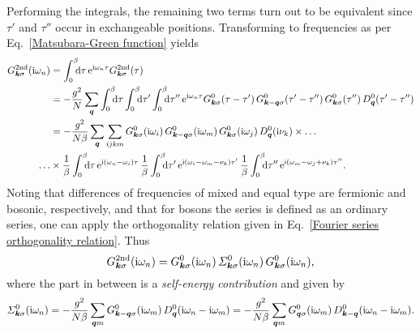 Performing the integrals, the remaining two terms turn out to be equivalent
since $\tau'$ and $\tau''$ occur in exchangeable positions. Transforming to
 frequencies as per Eq.~\ref{Matsubara-Green function} yields
%
\begin{align*}
    G \super{2nd}_{\vec k \sigma}(\I \omega_n)
    &= \int \from 0 \till \beta \D \tau \,
    \E^{\I \omega_n \tau} G \super{2nd}_{\vec k \sigma}(\tau) \\
    &= -\frac {g^2} N \sum_{\vec q}
    \int \from 0 \till \beta \D \tau
    \int \from 0 \till \beta \D \tau'
    \int \from 0 \till \beta \D \tau'' \,
    \E^{\I \omega_n \tau}
    G^0_{\vec k \sigma}(\tau - \tau') \,
    G^0_{\vec k - \vec q \sigma}(\tau' - \tau'') \,
    G^0_{\vec k \sigma}(\tau'') \,
    D^0_{\vec q}(\tau' - \tau'') \\
    &= -\frac {g^2}{N \beta} \sum_{\vec q} \sum_{i j k m}
    G^0_{\vec k \sigma}(\I \omega_i) \,
    G^0_{\vec k - \vec q \sigma}(\I \omega_m) \,
    G^0_{\vec k \sigma}(\I \omega_j) \,
    D^0_{\vec q}(\I \nu_k) \times \dots \\
    \dots &\times
    \frac 1 \beta \int \from 0 \till \beta \D \tau \,
    \E^{\I (\omega_n - \omega_i) \tau} \,
    \frac 1 \beta \int \from 0 \till \beta \D \tau' \,
    \E^{\I (\omega_i - \omega_m - \nu_k) \tau'} \,
    \frac 1 \beta \int \from 0 \till \beta \D \tau'' \,
    \E^{\I (\omega_m - \omega_j + \nu_k) \tau''}.
\end{align*}
%
Noting that differences of  frequencies of mixed and equal type
are fermionic and bosonic, respectively, and that for bosons the
 series is defined as an ordinary  series,
one can apply the orthogonality relation given in Eq.~\ref{Fourier series
orthogonality relation}. Thus
%
\begin{equation*}
    G \sp{\text{2nd}}_{\boldsymbol k \sigma}(\mathrm i \omega_n) =
    G^0_{\boldsymbol k \sigma}(\mathrm i \omega_n) \,
    \varSigma^0_{\boldsymbol k \sigma}(\mathrm i \omega_n) \,
    G^0_{\boldsymbol k \sigma}(\mathrm i \omega_n),
\end{equation*}
%
where the part in between is a \emph{self-energy contribution} and given by
%
\begin{equation*}
    \varSigma^0_{\boldsymbol k \sigma}(\mathrm i \omega_n)
    = -\frac {g^2}{N \beta} \sum_{\boldsymbol q m}
    G^0_{\boldsymbol k - \boldsymbol q \sigma}(\mathrm i \omega_m) \,
    D^0_{\boldsymbol q}(\mathrm i \omega_n - \mathrm i \omega_m)
    = -\frac {g^2}{N \beta} \sum_{\boldsymbol q m}
    G^0_{\boldsymbol q \sigma}(\mathrm i \omega_m) \,
    D^0_{\boldsymbol k - \boldsymbol q}(\mathrm i \omega_n - \mathrm i \omega_m).
\end{equation*}

